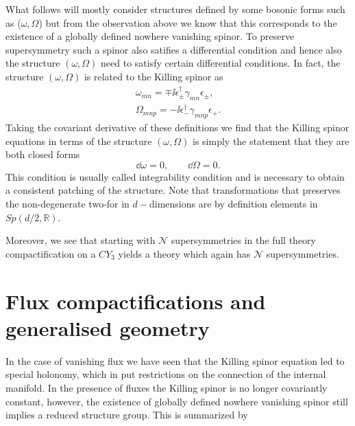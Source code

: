 What follows will mostly consider structures defined by some bosonic forms such as ($\omega,\Omega$) but from the observation above we know that this corresponds to the existence of a globally defined nowhere vanishing spinor. To preserve supersymmetry such a spinor also satifies a differential condition and hence also the structure $(\omega,\Omega)$ need to satisfy certain differential conditions. In fact, the structure $(\omega,\Omega)$ is related to the Killing spinor as 
\begin{align}
    \omega_{mn} = \mp\ii \epsilon^\dagger_\pm\gamma_{mn}\epsilon_\pm,\\
    \Omega_{mnp} = -\ii\epsilon^\dagger_-\gamma_{mnp}\epsilon_+.
\end{align}
Taking the covariant derivative of these definitions we find that the Killing spinor equations in terms of the structure $(\omega,\Omega)$ is simply the statement that they are both closed forms 
\begin{equation}
    \dd \omega = 0, \qquad \dd \Omega = 0.
\end{equation}
This condition is usually called integrability condition and is necessary to obtain a consistent patching of the structure. Note that transformations that preserves the non-degenerate two-for in $d-$dimensions are by definition elements in $Sp(d/2,\mathbb{R})$. 

Moreover, we see that starting with $\mathcal{N}$ supersymmetries in the full theory compactification on a $CY_3$ yields a theory which again has $\mathcal{N}$ supersymmetries.

\section{Flux compactifications and generalised geometry}
In the case of vanishing flux we have seen that the Killing spinor equation led to special holonomy, which in put restrictions on the connection of the internal manifold. In the presence of fluxes the Killing spinor is no longer covariantly constant, however, the existence of globally defined nowhere vanishing spinor still implies a reduced structure group. This is summarized by 

